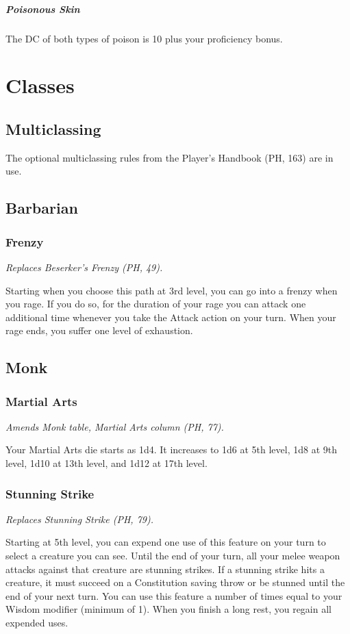 \documentclass[letterpaper,twocolumn,openany,nodeprecatedcode]{dndbook}
\begin{document}
\subparagraph{Poisonous Skin} The DC of both types of poison is 10 plus your proficiency bonus.




\section{Classes}

\subsection{Multiclassing}
The optional multiclassing rules from the Player's Handbook (PH, 163) are in use.

\subsection{Barbarian}

\subsubsection{Frenzy}
\textit{Replaces Beserker's Frenzy (PH, 49).}

Starting when you choose this path at 3rd level, you can go into a frenzy when you rage. If you do so, for the duration of your rage you can attack one additional time whenever you take the Attack action on your turn. When your rage ends, you suffer one level of exhaustion.

\subsection{Monk}

\subsubsection{Martial Arts}
\textit{Amends Monk table, Martial Arts column (PH, 77).}

Your Martial Arts die starts as 1d4. It increases to 1d6 at 5th level, 1d8 at 9th level, 1d10 at 13th level, and 1d12 at 17th level.

\subsubsection{Stunning Strike}
\textit{Replaces Stunning Strike (PH, 79).}

Starting at 5th level, you can expend one use of this feature on your turn to select a creature you can see. Until the end of your turn, all your melee weapon attacks against that creature are stunning strikes. If a stunning strike hits a creature, it must succeed on a Constitution saving throw or be stunned until the end of your next turn. You can use this feature a number of times equal to your Wisdom modifier (minimum of 1). When you finish a long rest, you regain all expended uses.
\end{document}
